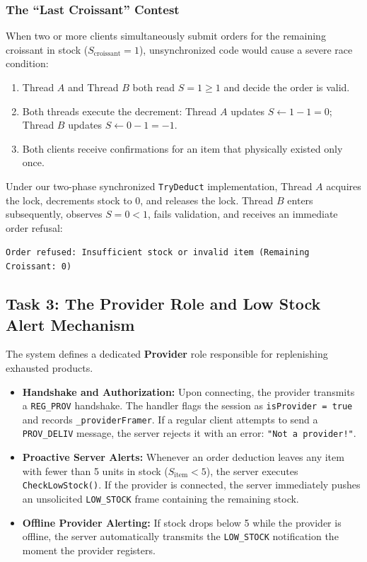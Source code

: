 \documentclass[12pt,a4paper]{article}
\begin{document}
\subsubsection{The ``Last Croissant'' Contest}
When two or more clients simultaneously submit orders for the remaining croissant in stock ($S_{\text{croissant}} = 1$), unsynchronized code would cause a severe race condition:
\begin{enumerate}
    \item Thread $A$ and Thread $B$ both read $S = 1 \ge 1$ and decide the order is valid.
    \item Both threads execute the decrement: Thread $A$ updates $S \leftarrow 1 - 1 = 0$; Thread $B$ updates $S \leftarrow 0 - 1 = -1$.
    \item Both clients receive confirmations for an item that physically existed only once.
\end{enumerate}
Under our two-phase synchronized \texttt{TryDeduct} implementation, Thread $A$ acquires the lock, decrements stock to 0, and releases the lock. Thread $B$ enters subsequently, observes $S = 0 < 1$, fails validation, and receives an immediate order refusal:
\begin{center}
\texttt{Order refused: Insufficient stock or invalid item (Remaining Croissant: 0)}
\end{center}

\subsection{Task 3: The Provider Role and Low Stock Alert Mechanism}
The system defines a dedicated \textbf{Provider} role responsible for replenishing exhausted products.
\begin{itemize}
    \item \textbf{Handshake and Authorization:} Upon connecting, the provider transmits a \texttt{REG\_PROV} handshake. The handler flags the session as \texttt{isProvider = true} and records \texttt{\_providerFramer}. If a regular client attempts to send a \texttt{PROV\_DELIV} message, the server rejects it with an error: \texttt{"Not a provider!"}.
    \item \textbf{Proactive Server Alerts:} Whenever an order deduction leaves any item with fewer than 5 units in stock ($S_{\text{item}} < 5$), the server executes \texttt{CheckLowStock()}. If the provider is connected, the server immediately pushes an unsolicited \texttt{LOW\_STOCK} frame containing the remaining stock.
    \item \textbf{Offline Provider Alerting:} If stock drops below 5 while the provider is offline, the server automatically transmits the \texttt{LOW\_STOCK} notification the moment the provider registers.
\end{itemize}
\end{document}
